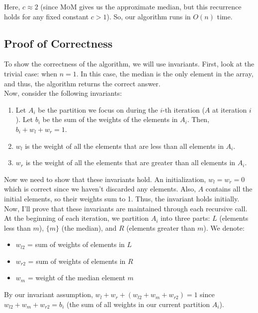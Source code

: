 \documentclass[a4paper]{article}
\begin{document}
\noindent Here, $c \approx 2$ (since \textsc{MoM} gives us the approximate median, but this recurrence holds for any fixed constant $c > 1$). So, our algorithm runs in $O(n)$ time.

\newpage
\subsection*{Proof of Correctness}
To show the correctness of the algorithm, we will use invariants. First, look at the trivial case: when $n = 1$. In this case, the median is the only element in the array, and thus, the algorithm returns the correct answer.\\

\noindent Now, consider the following invariants:
\begin{enumerate}
    \item Let $A_i$ be the partition we focus on during the $i$-th iteration ($A$ at iteration $i$). Let $b_i$ be the sum of the weights of the elements in $A_i$. Then, $b_i + w_l + w_r = 1$.
    \item $w_l$ is the weight of all the elements that are less than all elements in $A_i$.
    \item $w_r$ is the weight of all the elements that are greater than all elements in $A_i$.
\end{enumerate}

\noindent Now we need to show that these invariants hold. An initialization, $w_l = w_r = 0$ which is correct since we haven't discarded any elements. Also, $A$ contains all the initial elements, so their weights sum to 1. Thus, the invariant holds initially.\\

\noindent Now, I'll prove that these invariants are maintained through each recursive call. At the beginning of each iteration, we partition $A_i$ into three parts: $L$ (elements less than $m$), $\{m\}$ (the median), and $R$ (elements greater than $m$). We denote:
\begin{itemize}
    \item $w_{l2}$ = sum of weights of elements in $L$
    \item $w_{r2}$ = sum of weights of elements in $R$
    \item $w_m$ = weight of the median element $m$
\end{itemize}

\noindent By our invariant assumption, $w_l + w_r + (w_{l2} + w_m + w_{r2}) = 1$ since $w_{l2} + w_m + w_{r2} = b_i$ (the sum of all weights in our current partition $A_i$).\\
\end{document}
